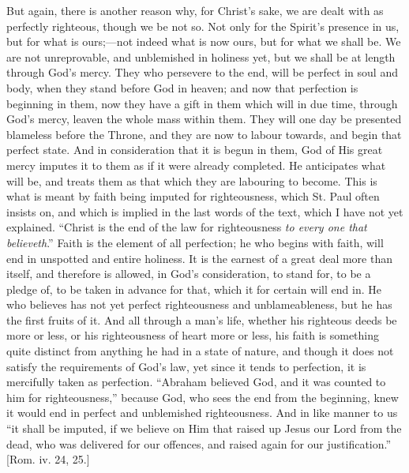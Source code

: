But again, there is another reason why, for Christ's sake, we are
dealt with as perfectly righteous, though we be not so. Not only for
the Spirit's presence in us, but for what is ours;—not indeed what
is now ours, but for what we shall be. We are not unreprovable, and
unblemished in holiness yet, but we shall be at length through God's
mercy. They who persevere to the end, will be perfect in soul and
body, when they stand before God in heaven; and now that perfection is
beginning in them, now they have a gift in them which will in due
time, through God's mercy, leaven the whole mass within them. They
will one day be presented blameless before the Throne, and they are
now to labour towards, and begin that perfect state. And in
consideration that it is begun in them, God of His great mercy imputes
it to them as if it were already completed. He anticipates what will
be, and treats them as that which they are labouring to become. This
is what is meant by faith being imputed for righteousness, which St.
Paul often insists on, and which is implied in the last words of the
text, which I have not yet explained. ``Christ is the end of the
law for righteousness \emph{to every one that believeth}.'' Faith
is the element of all perfection; he who begins with faith, will end
in unspotted and entire holiness. It is the earnest of a great deal
more than itself, and therefore is allowed, in God's consideration, to
stand for, to be a pledge of, to be taken in advance for that, which
it for certain will end in. He who believes has not yet perfect
righteousness and unblameableness, but he has the first fruits of it.
And all through a man's life, whether his righteous deeds be more or
less, or his righteousness of heart more or less, his faith is
something quite distinct from anything he had in a state of nature,
and though it does not satisfy the requirements of God's law, yet
since it tends to perfection, it is mercifully taken as perfection.
``Abraham believed God, and it was counted to him for
righteousness,'' because God, who sees the end from the beginning,
knew it would end in perfect and unblemished righteousness. And in
like manner to us ``it shall be imputed, if we believe on Him that
raised up Jesus our Lord from the dead, who was delivered for our
offences, and raised again for our justification.'' [Rom. iv. 24,
25.]


